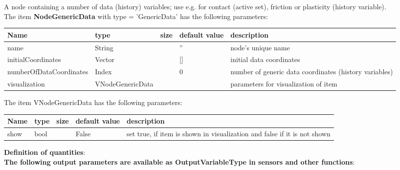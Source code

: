 A node containing a number of data (history) variables; use e.g. for contact (active set), friction or plasticity (history variable).
 \\\vspace{12pt} \noindent The item {\bf NodeGenericData} with type = 'GenericData' has the following parameters:\vspace{-1cm}\\ 
\begin{center}
  \footnotesize
  \begin{longtable}{| p{4.5cm} | p{2.5cm} | p{0.5cm} | p{2.5cm} | p{6cm} |}
    \hline
    \bf Name & \bf type & \bf size & \bf default value & \bf description \\ \hline
    name &     String &      &     '' &     node's unique name\\ \hline
    initialCoordinates &     Vector &      &     [] &     initial data coordinates\\ \hline
    numberOfDataCoordinates &     Index &      &     0 &     number of generic data coordinates (history variables)\\ \hline
    visualization & VNodeGenericData & & & parameters for visualization of item \\ \hline
	  \end{longtable}
	\end{center}
The item VNodeGenericData has the following parameters:\vspace{-1cm}\\ 
\begin{center}
  \footnotesize
  \begin{longtable}{| p{4.5cm} | p{2.5cm} | p{0.5cm} | p{2.5cm} | p{6cm} |}
    \hline
    \bf Name & \bf type & \bf size & \bf default value & \bf description \\ \hline
    show &     bool &      &     False &     set true, if item is shown in visualization and false if it is not shown\\ \hline
	  \end{longtable}
	\end{center}
{\bf Definition of quantities}:\\
\finishTable
{\bf The following output parameters are available as OutputVariableType in sensors and other functions}:\\ 
\finishTable
\newpage

